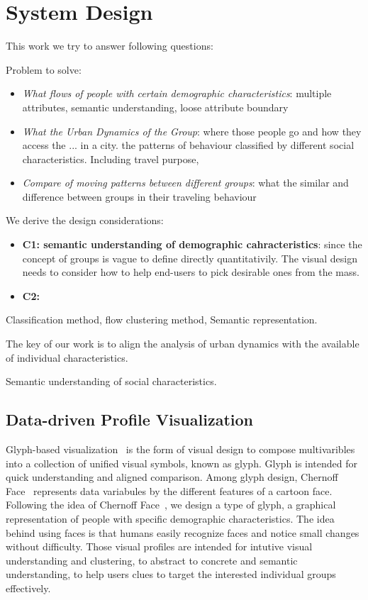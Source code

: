 \section{System Design}


This work we try to answer following questions:

Problem to solve: 
\begin{itemize}
\item \textit{What flows of people with certain demographic characteristics}: multiple attributes, semantic understanding, loose attribute boundary
\item \textit{What the Urban Dynamics of the Group}: where those people go and how they access the ... in a city. the patterns of behaviour classified by different social characteristics.  Including travel purpose, 
\item \textit{Compare of moving patterns between different groups}: what the similar and difference between groups in their traveling behaviour
\end{itemize}

We derive the design considerations:

\begin{itemize}
\item \textbf{C1: semantic understanding of demographic cahracteristics}: since the concept of groups is vague to define directly quantitativily. The visual design needs to consider how to help end-users to pick desirable ones from the mass. 
\item \textbf{C2: }
\end{itemize}

Classification method, flow clustering method, Semantic representation. 

The key of our work is to align the analysis of urban dynamics with the available of individual characteristics. 

Semantic understanding of social characteristics.

\subsection{Data-driven Profile Visualization}

Glyph-based visualization~\cite{borgo2013glyph} is the form of visual design to compose multivaribles into a collection of unified visual symbols, known as glyph. Glyph is intended for quick understanding and aligned comparison. Among glyph design, Chernoff Face~\cite{chernoff1973use} represents data variabules by the different features of a cartoon face. Following the idea of Chernoff Face~\cite{chernoff1973use}, we design a type of glyph, a graphical representation of people with specific demographic characteristics. The idea behind using faces is that humans easily recognize faces and notice small changes without difficulty. Those visual profiles are intended for intutive visual understanding and clustering, to abstract to concrete and semantic understanding, to help users clues to target the interested individual groups effectively.

